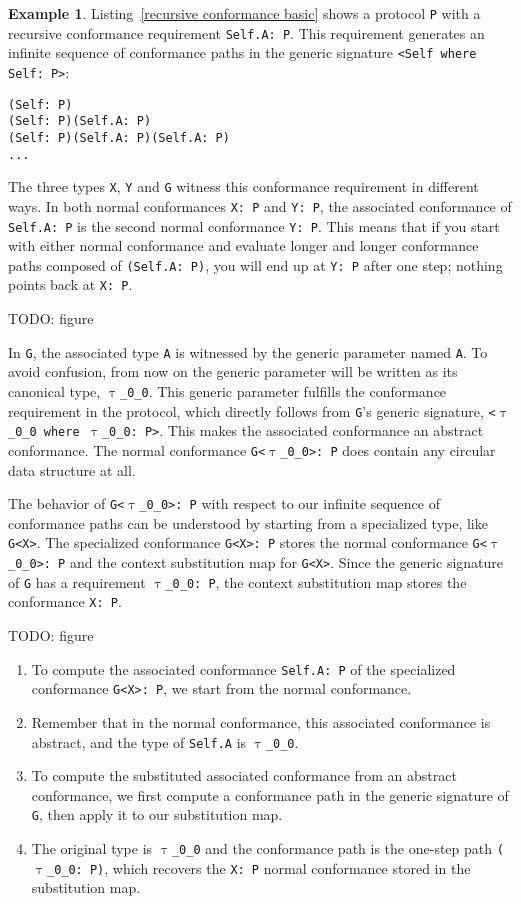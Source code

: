 \documentclass[a4paper,headsepline,bibliography=totoc,toc=flat,fleqn,twoside=semi]{scrbook}
\theoremstyle{definition}
\theoremstyle{definition}
\newtheorem{example}{Example}[chapter]
\theoremstyle{definition}
\newcommand{\ttgp}[2]{\texttt{$\uptau$\_#1\_#2}}
\begin{document}
\begin{example} Listing~\ref{recursive conformance basic} shows a protocol \texttt{P} with a recursive conformance requirement \texttt{Self.A:\ P}. This requirement generates an infinite sequence of conformance paths in the generic signature \texttt{<Self where Self:\ P>}:
\begin{verbatim}
(Self: P)
(Self: P)(Self.A: P)
(Self: P)(Self.A: P)(Self.A: P)
...
\end{verbatim}

The three types \texttt{X}, \texttt{Y} and \texttt{G} witness this conformance requirement in different ways. In both normal conformances \texttt{X:\ P} and \texttt{Y:\ P}, the associated conformance of \texttt{Self.A:\ P} is the second normal conformance \texttt{Y:\ P}. This means that if you start with either normal conformance and evaluate longer and longer conformance paths composed of \texttt{(Self.A:\ P)}, you will end up at \texttt{Y:\ P} after one step; nothing points back at \texttt{X:\ P}. 

TODO: figure

In \texttt{G}, the associated type \texttt{A} is witnessed by the generic parameter named \texttt{A}. To avoid confusion, from now on the generic parameter will be written as its canonical type, \ttgp{0}{0}. This generic parameter fulfills the conformance requirement in the protocol, which directly follows from \texttt{G}'s generic signature, \texttt{<\ttgp{0}{0} where \ttgp{0}{0}:\ P>}. This makes the associated conformance an abstract conformance. The normal conformance \texttt{G<\ttgp{0}{0}>:\ P} does contain any circular data structure at all.

The behavior of \texttt{G<\ttgp{0}{0}>:\ P} with respect to our infinite sequence of conformance paths can be understood by starting from a specialized type, like \texttt{G<X>}. The specialized conformance \texttt{G<X>:\ P} stores the normal conformance \texttt{G<\ttgp{0}{0}>:\ P} and the context substitution map for \texttt{G<X>}. Since the generic signature of \texttt{G} has a requirement \texttt{\ttgp{0}{0}:\ P}, the context substitution map stores the conformance \texttt{X:\ P}.

TODO: figure

\begin{enumerate}
\item To compute the associated conformance \texttt{Self.A:\ P} of the specialized conformance \texttt{G<X>:\ P}, we start from the normal conformance.
\item Remember that in the normal conformance, this associated conformance is abstract, and the type of \texttt{Self.A} is \ttgp{0}{0}.
\item To compute the substituted associated conformance from an abstract conformance, we first compute a conformance path in the generic signature of \texttt{G}, then apply it to our substitution map.
\item The original type is \ttgp{0}{0} and the conformance path is the one-step path \texttt{(\ttgp{0}{0}:\ P)}, which recovers the \texttt{X:\ P} normal conformance stored in the substitution map.
\end{enumerate}


\end{example}
\end{document}
